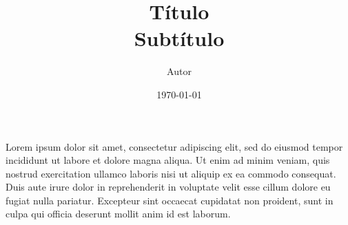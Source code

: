 \documentclass[a4paper,onecolumn,final,11pt]{article}
\title{
	\bfseries  %
	Título \\
	{\large Subtítulo}
}
\author{Autor}
\date{\today}
\begin{document}
\maketitle

Lorem ipsum dolor sit amet, consectetur adipiscing elit, sed do eiusmod tempor incididunt ut labore et dolore magna aliqua. Ut enim ad minim veniam, quis nostrud exercitation ullamco laboris nisi ut aliquip ex ea commodo consequat. Duis aute irure dolor in reprehenderit in voluptate velit esse cillum dolore eu fugiat nulla pariatur. Excepteur sint occaecat cupidatat non proident, sunt in culpa qui officia deserunt mollit anim id est laborum. 
\end{document}
